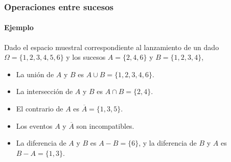 \begin{frame}
\frametitle{Operaciones entre sucesos}
\framesubtitle{Ejemplo}
Dado el espacio muestral correspondiente al lanzamiento de un dado $\Omega=\{1,2,3,4,5,6\}$ y los sucesos $A=\{2,4,6\}$ y $B=\{1,2,3,4\}$, 
\begin{itemize}
	\item La unión de $A$ y $B$ es $A\cup B=\{1,2,3,4,6\}$.
	\item La intersección de $A$ y $B$ es $A\cap B=\{2,4\}$.
	\item El contrario de $A$ es $\overline A=\{1,3,5\}$.
	\item Los eventos $A$ y $\overline A$ son incompatibles.
	\item La diferencia de $A$ y $B$ es $A-B=\{6\}$, y la diferencia de $B$ y $A$ es $B-A=\{1,3\}$.
\end{itemize}
\end{frame}


